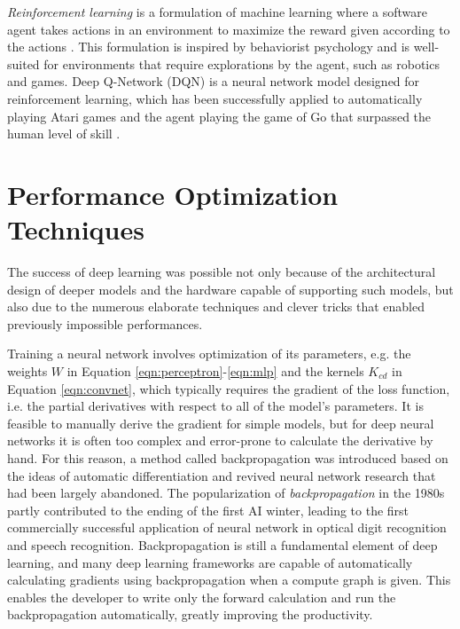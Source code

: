 \emph{Reinforcement learning} is a formulation of machine learning where a software agent takes actions in an environment to maximize the reward given according to the actions \cite{sutton2018reinforcement}.
This formulation is inspired by behaviorist psychology and is well-suited for environments that require explorations by the agent, such as robotics and games.
Deep Q-Network (DQN) \cite{mnih2015dqn} is a neural network model designed for reinforcement learning, which has been successfully applied to automatically playing Atari games \cite{mnih2013atari} and the agent playing the game of Go that surpassed the human level of skill \cite{silver2016alphago}.


\section{Performance Optimization Techniques}

The success of deep learning was possible not only because of the architectural design of deeper models and the hardware capable of supporting such models, but also due to the numerous elaborate techniques and clever tricks that enabled previously impossible performances.

Training a neural network involves optimization of its parameters, e.g. the weights $W$ in Equation \ref{eqn:perceptron}-\ref{eqn:mlp} and the kernels $K_{cd}$ in Equation \ref{eqn:convnet}, which typically requires the gradient of the loss function, i.e. the partial derivatives with respect to all of the model's parameters.
It is feasible to manually derive the gradient for simple models, but for deep neural networks it is often too complex and error-prone to calculate the derivative by hand.
For this reason, a method called backpropagation \cite{werbos1982backpropagation, rumelhart1986backpropagation} was introduced based on the ideas of automatic differentiation \cite{linnainmaa1970ad} and revived neural network research that had been largely abandoned.
The popularization of \emph{backpropagation} in the 1980s partly contributed to the ending of the first AI winter, leading to the first commercially successful application of neural network in optical digit recognition and speech recognition.
Backpropagation is still a fundamental element of deep learning, and many deep learning frameworks are capable of automatically calculating gradients using backpropagation when a compute graph is given.
This enables the developer to write only the forward calculation and run the backpropagation automatically, greatly improving the productivity.


